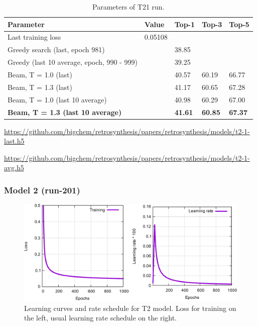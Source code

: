 \documentclass{article}
\begin{document}
\begin{table}[h!]
\caption{Parameters of T21 run.}
  \centering
  \begin{tabular}{p{8.2cm}p{1.5cm}p{1.5cm}p{1.5cm}p{1.5cm}}
    \toprule
    Parameter & Value & Top-1 & Top-3 & Top-5 \\
    \midrule
    Last training loss & 0.05108 & & & \\
    \midrule
    Greedy search (last, epoch 981) & & 38.85 & & \\
    Greedy (last 10 average, epoch, 990 - 999) & & 39.25 & & \\
    \midrule
    Beam, T = 1.0 (last) & & 40.57 &60.19  & 66.77 \\
    Beam, T = 1.3 (last) & & 41.17 & 60.65 &  67.28 \\ 
    \midrule
    Beam, T = 1.0 (last 10 average) & & 40.98 & 60.29 & 67.00 \\
    \textbf{Beam, T = 1.3 (last 10 average)} & &  \textbf{41.61} & \textbf{60.85} & \textbf{67.37} \\ 
    \bottomrule
  \end{tabular}
  \label{tbl:t11}

\end{table} 

\url{https://github.com/bigchem/retrosynthesis/papers/retrosynthesis/models/t2-1-last.h5}

\url{https://github.com/bigchem/retrosynthesis/papers/retrosynthesis/models/t2-1-avg.h5}

\newpage
 \subsubsection{Model 2 (run-201)}
 
\begin{figure}[h!]
  \centering
  \includegraphics[width = 16.5cm]{images/t2-2.pdf}
  \caption{Learning curves and rate schedule for T2 model. Loss for training on the left, usual learning rate schedule on the right.}
  \label{fig:t21}
\end{figure}
\end{document}
